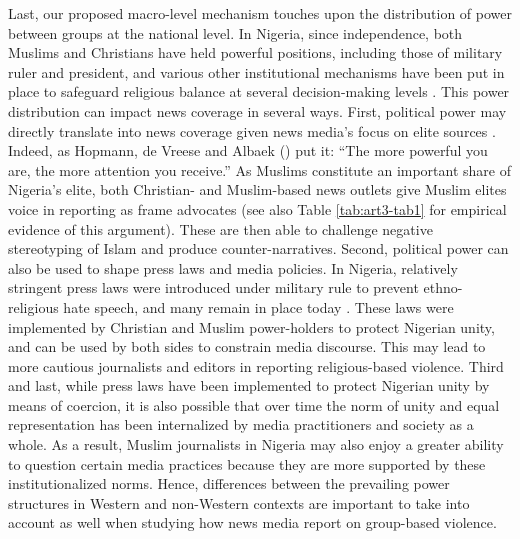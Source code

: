 Last, our proposed macro-level mechanism touches upon the distribution of power between groups at the national level. In Nigeria, since independence, both Muslims and Christians have held powerful positions, including those of military ruler and president, and various other institutional mechanisms have been put in place to safeguard religious balance at several decision-making levels \citep[e.g.,][]{Mustapha2009}. This power distribution can impact news coverage in several ways. First, political power may directly translate into news coverage given news media's focus on elite sources \citep{Gans1980}. Indeed, as Hopmann, de Vreese and Albaek (\citeyear[][pp. 276-277]{Hopmann2011}) put it: ``The more powerful you are, the more attention you receive.'' As Muslims constitute an important share of Nigeria's elite, both Christian- and Muslim-based news outlets give Muslim elites voice in reporting as frame advocates (see also Table \ref{tab:art3-tab1} for empirical evidence of this argument). These are then able to challenge negative stereotyping of Islam and produce counter-narratives. Second, political power can also be used to shape press laws and media policies. In Nigeria, relatively stringent press laws were introduced under military rule to prevent ethno-religious hate speech, and many remain in place today \citep{Demarest2018}. These laws were implemented by Christian and Muslim power-holders to protect Nigerian unity, and can be used by both sides to constrain media discourse. This may lead to more cautious journalists and editors in reporting religious-based violence. Third and last, while press laws have been implemented to protect Nigerian unity by means of coercion, it is also possible that over time the norm of unity and equal representation has been internalized by media practitioners and society as a whole. As a result, Muslim journalists in Nigeria may also enjoy a greater ability to question certain media practices because they are more supported by these institutionalized norms. Hence, differences between the prevailing power structures in Western and non-Western contexts are important to take into account as well when studying how news media report on group-based violence. 
\newpage



